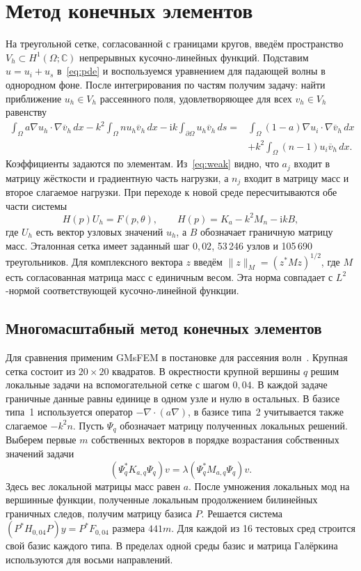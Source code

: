 \documentclass[11pt,a4paper]{article}
\newcommand{\ii}{\mathrm{i}}
\newcommand{\C}{\mathbb C}
\newcommand{\norm}[1]{\lVert #1\rVert}
\begin{document}
\clearpage
\section{Метод конечных элементов}
На треугольной сетке, согласованной с границами кругов, введём пространство $V_h\subset H^1(\Omega;\C)$ непрерывных кусочно-линейных функций. Подставим $u=u_i+u_s$ в~\eqref{eq:pde} и воспользуемся уравнением для падающей волны в однородном фоне. После интегрирования по частям получим задачу: найти приближение $u_h\in V_h$ рассеянного поля, удовлетворяющее для всех $v_h\in V_h$ равенству
\begin{align}
 \int_\Omega a\nabla u_h\cdot\nabla\overline v_h\,dx-k^2\int_\Omega n u_h\overline v_h\,dx
       -\ii k\int_{\partial\Omega}u_h\overline v_h\,ds
      ={}&\int_\Omega(1-a)\nabla u_i\cdot\nabla\overline v_h\,dx\nonumber\\
      &+ k^2\int_\Omega(n-1)u_i\overline v_h\,dx .\label{eq:weak}
\end{align}
Коэффициенты задаются по элементам. Из~\eqref{eq:weak} видно, что $a_j$ входит в матрицу жёсткости и градиентную часть нагрузки, а $n_j$ входит в матрицу масс и второе слагаемое нагрузки. При переходе к новой среде пересчитываются обе части системы
\begin{equation}
 H(p)U_h=F(p,\theta),\qquad H(p)=K_a-k^2 M_n-\ii k B ,
 \label{eq:fem}
\end{equation}
где $U_h$ есть вектор узловых значений $u_h$, а $B$ обозначает граничную матрицу масс. Эталонная сетка имеет заданный шаг $0{,}02$, 53\,246 узлов и 105\,690 треугольников. Для комплексного вектора $z$ введём $\norm{z}_M=(z^*Mz)^{1/2}$, где $M$ есть согласованная матрица масс с единичным весом. Эта норма совпадает с $L^2$-нормой соответствующей кусочно-линейной функции.

\subsection*{Многомасштабный метод конечных элементов}
Для сравнения применим GMsFEM в постановке для рассеяния волн~\cite{kalachikova}. Крупная сетка состоит из $20\times20$ квадратов. В окрестности крупной вершины $q$ решим локальные задачи на вспомогательной сетке с шагом $0{,}04$. В каждой задаче граничные данные равны единице в одном узле и нулю в остальных. В базисе типа~1 используется оператор $-\nabla\!\cdot(a\nabla)$, в базисе типа~2 учитывается также слагаемое $-k^2n$. Пусть $\Psi_q$ обозначает матрицу полученных локальных решений. Выберем первые $m$ собственных векторов в порядке возрастания собственных значений задачи
\[
 (\Psi_q^*K_{a,q}\Psi_q)v=\lambda(\Psi_q^*M_{a,q}\Psi_q)v.
\]
Здесь вес локальной матрицы масс равен $a$. После умножения локальных мод на вершинные функции, полученные локальным продолжением билинейных граничных следов, получим матрицу базиса $P$. Решается система $(P^*H_{0{,}04}P)y=P^*F_{0{,}04}$ размера $441m$. Для каждой из 16 тестовых сред строится свой базис каждого типа. В пределах одной среды базис и матрица Галёркина используются для восьми направлений.
\end{document}
